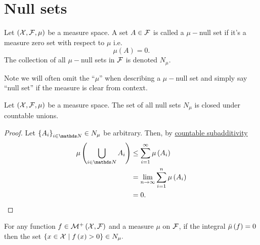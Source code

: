 \section{Null sets}
\begin{defn}
\label{def:nullSet}Let $\left(\mathcal{X},\mathcal{F},\mu\right)$ be a measure space.
A set $A\in\mathcal{F}$ is called a $\mu-$null set if it's a measure zero
set with respect to $\mu$ i.e.
\[
\mu\left(A\right)=0.
\]
The collection of all $\mu-$null sets in $\mathcal{F}$ is denoted $N_{\mu}$.
\end{defn}

Note we will often omit the ``$\mu$'' when describing a $\mu-$null
set and simply say ``null set'' if the measure is clear from context.
\begin{prop}
\label{prop:nullClosureCountableUnion}Let $\left(\mathcal{X},\mathcal{F},\mu\right)$
be a measure space. The set of all null sets $N_{\mu}$ is closed
under countable unions.
\end{prop}

\begin{proof}
Let $\left\{ A_{i}\right\} _{i\in\N}\in N_{\mu}$ be arbitrary. Then,
by \hyperref[cor:countableSubadditivity]{countable subadditivity}
\begin{align*}
\mu\left(\bigcup_{i\in\N}A_{i}\right) & \leq\sum_{i=1}^{\infty}\mu\left(A_{i}\right)\\
 & =\lim_{n\to\infty}\sum_{i=1}^{n}\mu\left(A_{i}\right)\\
 & =0.
\end{align*}
\end{proof}
\begin{prop}
\label{prop:intZeroFuncZero}For any function $f\in\mathcal{M}^{+}\left(\mathcal{X},\mathcal{F}\right)$
and a measure $\mu$ on $\mathcal{F}$, if the integral $\bar{\mu}\left(f\right)=0$
then the set $\left\{ x\in\mathcal{X}\mid f\left(x\right)>0\right\} \in N_{\mu}.$
\end{prop}

